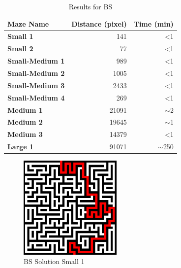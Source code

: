 \documentclass[conference]{IEEEtran}
\begin{document}
\begin{table}[h]
\begin{tabular}{|l|r|r|}
\hline
\textbf{Maze Name}      & \multicolumn{1}{l|}{\textbf{Distance (pixel)}} & \multicolumn{1}{l|}{\textbf{Time (min)}} \\ \hline
\textbf{Small 1}        & 141                                            & \textless 1                              \\ \hline
\textbf{Small 2}        & 77                                             & \textless 1                              \\ \hline
\textbf{Small-Medium 1} & 989                                            & \textless 1                              \\ \hline
\textbf{Small-Medium 2} & 1005                                           & \textless 1                              \\ \hline
\textbf{Small-Medium 3} & 2433                                           & \textless 1                              \\ \hline
\textbf{Small-Medium 4} & 269                                            & \textless 1                              \\ \hline
\textbf{Medium 1}       & 21091                                          & $\sim$2                                  \\ \hline
\textbf{Medium 2}       & 19645                                          & $\sim$1                                  \\ \hline
\textbf{Medium 3}       & 14379                                          & \textless 1                              \\ \hline
\textbf{Large 1}        & 91071                                          & $\sim$250                                \\ \hline
\end{tabular}
\caption{Results for BS}
\label{BS}
\end{table}
    \begin{figure}[h]
        \centering
        \includegraphics[width=5cm]{images/BS_Small1.png}
        \caption{BS Solution Small 1}
    \end{figure}
\end{document}
